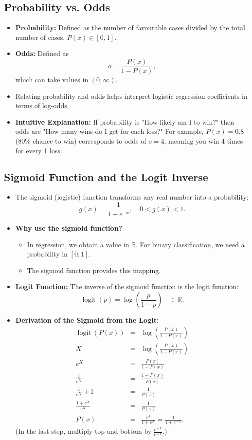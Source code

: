 \documentclass[10pt]{article}
\begin{document}
\subsection{Probability vs. Odds}
\begin{itemize}
    \item \textbf{Probability:} Defined as the number of favourable cases divided by the total number of cases, \(\displaystyle P(x)\in[0,1]\).
    \item \textbf{Odds:} Defined as 
    \[
    o=\frac{P(x)}{1-P(x)},
    \]
    which can take values in \((0,\infty)\). 
    \item Relating probability and odds helps interpret logistic regression coefficients in terms of log-odds.
    \item \textbf{Intuitive Explanation:} If probability is "How likely am I to win?" then odds are "How many wins do I get for each loss?" For example, \(P(x) = 0.8\) (80\% chance to win) corresponds to odds of \(o = 4\), meaning you win 4 times for every 1 loss.
\end{itemize}

\subsection{Sigmoid Function and the Logit Inverse}
\begin{itemize}
    \item The sigmoid (logistic) function transforms any real number into a probability:
    \[
    g(x)=\frac{1}{1+e^{-x}}, \quad 0<g(x)<1.
    \]
    \item \textbf{Why use the sigmoid function?} 
    \begin{itemize}
        \item In regression, we obtain a value in \(\mathbb{R}\). For binary classification, we need a probability in \([0,1]\). 
        \item The sigmoid function provides this mapping.
    \end{itemize}
    \item \textbf{Logit Function:} The inverse of the sigmoid function is the logit function:
    \[
    \operatorname{logit}(p)=\log\left(\frac{p}{1-p}\right)\quad \in \mathbb{R}.
    \]
    \item \textbf{Derivation of the Sigmoid from the Logit:}
    \[
    \begin{array}{rcl}
    \operatorname{logit}(P(x)) &=& \log \left(\frac{P(x)}{1-P(x)}\right) \\[1mm]
    X &=& \log \left(\frac{P(x)}{1-P(x)}\right) \\[1mm]
    e^{X} &=& \frac{P(x)}{1-P(x)} \\[1mm]
    \frac{1}{e^{X}} &=& \frac{1-P(x)}{P(x)} \\[1mm]
    \frac{1}{e^{X}} + 1 &=& \frac{1}{P(x)} \\[1mm]
    \frac{1+e^{X}}{e^{X}} &=& \frac{1}{P(x)} \\[1mm]
    P(x) &=& \frac{e^{X}}{1+e^{X}} = \frac{1}{1+e^{-X}}.
    \end{array}
    \]
    (In the last step, multiply top and bottom by \(\frac{e^{-X}}{e^{-X}}\).)
\end{itemize}
\end{document}
